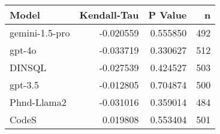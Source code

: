 \begin{tabular}{lrrr}
\toprule
Model & Kendall-Tau & P Value & n \\
\midrule
gemini-1.5-pro & -0.020559 & 0.555850 & 492 \\
gpt-4o & -0.033719 & 0.330627 & 512 \\
DINSQL & -0.027539 & 0.424527 & 503 \\
gpt-3.5 & -0.012805 & 0.704874 & 500 \\
Phnd-Llama2 & -0.031016 & 0.359014 & 484 \\
CodeS & 0.019808 & 0.553404 & 501 \\
\bottomrule
\end{tabular}
